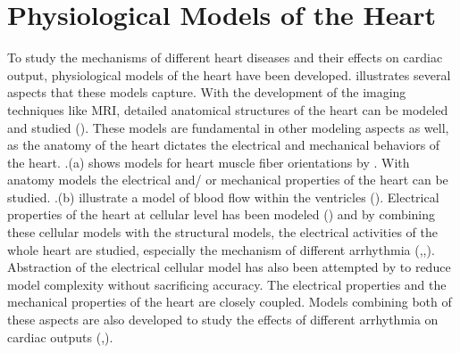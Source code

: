 \section{Physiological Models of the Heart}
To study the mechanisms of different heart diseases and their effects on cardiac output, physiological models of the heart have been developed.  illustrates several aspects that these models capture. With the development of the imaging techniques like MRI, detailed anatomical structures of the heart can be modeled and studied (\cite{geometric}). These models are fundamental in other modeling aspects as well, as the anatomy of the heart dictates the electrical and mechanical behaviors of the heart. .(a) shows models for heart muscle fiber orientations by \cite{fiber}. With anatomy models the electrical and/ or mechanical properties of the heart can be studied. .(b) illustrate a model of blood flow within the ventricles (\cite{bloodflow}). Electrical properties of the heart at cellular level has been modeled (\cite{cellular}) and by combining these cellular models with the structural models, the electrical activities of the whole heart are studied, especially the mechanism of different arrhythmia (\cite{natalia},\cite{Grosu_MHA},\cite{Grosu_wave}). Abstraction of the electrical cellular model has also been attempted by \cite{Grosu_abstract} to reduce model complexity without sacrificing accuracy. The electrical properties and the mechanical properties of the heart are closely coupled. Models combining both of these aspects are also developed to study the effects of different arrhythmia on cardiac outputs (\cite{natalia},\cite{eletro_mechanical}).

